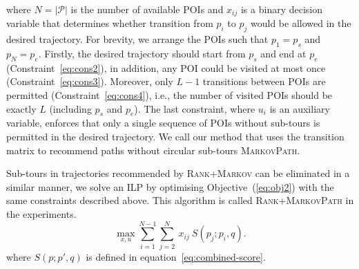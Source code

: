 where $N=|\mathcal{P}|$ is the number of available POIs and $x_{ij}$ is a binary decision variable
that determines whether transition from $p_i$ to $p_j$ would be allowed in the desired trajectory.
For brevity, we arrange the POIs such that $p_1 = p_s$ and $p_N = p_e$.
Firstly, the desired trajectory should start from $p_s$ and end at $p_e$ (Constraint~\ref{eq:cons2}),
in addition, any POI could be visited at most once (Constraint~\ref{eq:cons3}).
Moreover, only $L-1$ transitions between POIs are permitted (Constraint~\ref{eq:cons4}),
i.e., the number of visited POIs should be exactly $L$ (including $p_s$ and $p_e$).
The last constraint, where $u_i$ is an auxiliary variable,
enforces that only a single sequence of POIs without sub-tours is permitted in the desired trajectory.
We call our method that uses the transition matrix to recommend paths
without circular sub-tours \textsc{MarkovPath}.


Sub-tours in trajectories recommended by \textsc{Rank+Markov} can be eliminated in a similar manner,
we solve an ILP by optimising Objective~(\ref{eq:obj2}) with the same constraints described above.
This algorithm is called \textsc{Rank+MarkovPath} in the experiments.
\eqmoveup
\eqmoveup
\begin{equation}
\label{eq:obj2}
\max_{x,u} \sum_{i=1}^{N-1} \sum_{j=2}^N ~x_{ij} ~S(p_j; p_i, q).
\end{equation}
where $S(p;p',q)$ is defined in equation~\ref{eq:combined-score}.



